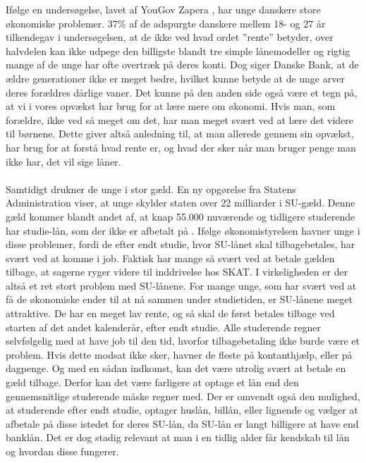  Ifølge en undersøgelse, lavet af YouGov Zapera \cite{DanskeB1}, har unge danskere store økonomiske problemer. 37\% af de adspurgte danskere mellem 18- og 27 år tilkendegav i undersøgelsen, at de ikke ved hvad ordet ”rente” betyder, over halvdelen kan ikke udpege den billigste blandt tre simple lånemodeller og rigtig mange af de unge har ofte overtræk på deres konti. Dog siger Danske Bank, at de ældre generationer ikke er meget bedre, hvilket kunne betyde at de unge arver deres forældres dårlige vaner. Det kunne på den anden side også være et tegn på, at vi i vores opvækst har brug for at lære mere om økonomi. Hvis man, som forældre, ikke ved så meget om det, har man meget svært ved at lære det videre til børnene. Dette giver altså anledning til, at man allerede gennem sin opvækst, har brug for at forstå hvad rente er, og hvad der sker når man bruger penge man ikke har, det vil sige låner.    \\
\\
Samtidigt drukner de unge i stor gæld. En ny opgørelse fra Statens Administration viser, at unge skylder staten over 22 milliarder i SU-gæld. Denne gæld kommer blandt andet af, at knap 55.000 nuværende og tidligere studerende har studie-lån, som der ikke er afbetalt på \cite{dr.dk} . Ifølge økonomistyrelsen havner unge i disse problemer, fordi de efter endt studie, hvor SU-lånet skal tilbagebetales, har svært ved at komme i job\cite{jobindex}. Faktisk har mange så svært ved at betale gælden tilbage, at sagerne ryger videre til inddrivelse hos SKAT\cite{BusinessDK1}. I virkeligheden er der altså et ret stort problem med SU-lånene. For mange unge, som har svært ved at få de økonomiske ender til at nå sammen under studietiden, er SU-lånene meget attraktive. De har en meget lav rente, og så skal de først betales tilbage ved starten af det andet kalenderår, efter endt studie. Alle studerende regner selvfølgelig med at have job til den tid, hvorfor tilbagebetaling ikke burde være et problem. Hvis dette modsat ikke sker, havner de fleste på kontanthjælp, eller på dagpenge. Og med en sådan indkomst, kan det være utrolig svært at betale en gæld tilbage. Derfor kan det være farligere at optage et lån end den gennemsnitlige studerende måske regner med. Der er omvendt også den mulighed, at studerende efter endt studie, optager huslån, billån, eller lignende og vælger at afbetale på disse istedet for deres SU-lån, da SU-lån er langt billigere at have end banklån. Det er dog stadig relevant at man i en tidlig alder får kendskab til lån og hvordan disse fungerer.  \\
